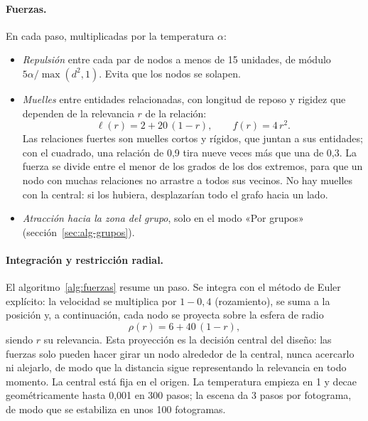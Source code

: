\paragraph{Fuerzas.} En cada paso, multiplicadas por la temperatura $\alpha$:
\begin{itemize}
  \item \emph{Repulsión} entre cada par de nodos a menos de 15 unidades, de módulo $5\alpha/\max(d^2,1)$. Evita que los nodos se solapen.
  \item \emph{Muelles} entre entidades relacionadas, con longitud de reposo y rigidez que dependen de la relevancia $r$ de la relación:
  \begin{equation}
    \ell(r) = 2 + 20\,(1-r), \qquad f(r) = 4\,r^2 .
  \end{equation}
  Las relaciones fuertes son muelles cortos y rígidos, que juntan a sus entidades; con el cuadrado, una relación de 0,9 tira nueve veces más que una de 0,3. La fuerza se divide entre el menor de los grados de los dos extremos, para que un nodo con muchas relaciones no arrastre a todos sus vecinos. No hay muelles con la central: si los hubiera, desplazarían todo el grafo hacia un lado.
  \item \emph{Atracción hacia la zona del grupo}, solo en el modo «Por grupos» (sección~\ref{sec:alg-grupos}).
\end{itemize}

\paragraph{Integración y restricción radial.} El algoritmo~\ref{alg:fuerzas} resume un paso. Se integra con el método de Euler explícito: la velocidad se multiplica por $1-0{,}4$ (rozamiento), se suma a la posición y, a continuación, cada nodo se proyecta sobre la esfera de radio
\begin{equation}
  \rho(r) = 6 + 40\,(1-r),
\end{equation}
siendo $r$ su relevancia. Esta proyección es la decisión central del diseño: las fuerzas solo pueden hacer girar un nodo alrededor de la central, nunca acercarlo ni alejarlo, de modo que la distancia sigue representando la relevancia en todo momento. La central está fija en el origen. La temperatura empieza en 1 y decae geométricamente hasta 0,001 en 300 pasos; la escena da 3 pasos por fotograma, de modo que se estabiliza en unos 100 fotogramas.

